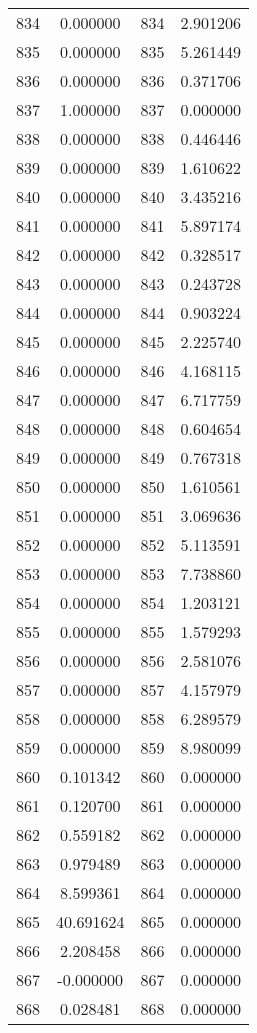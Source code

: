 \documentclass[12pt]{article}
\begin{document}
\begin{longtable}{@{}cccc@{}}
834 & 0.000000 & 834 & 2.901206 \\
835 & 0.000000 & 835 & 5.261449 \\
836 & 0.000000 & 836 & 0.371706 \\
837 & 1.000000 & 837 & 0.000000 \\
838 & 0.000000 & 838 & 0.446446 \\
839 & 0.000000 & 839 & 1.610622 \\
840 & 0.000000 & 840 & 3.435216 \\
841 & 0.000000 & 841 & 5.897174 \\
842 & 0.000000 & 842 & 0.328517 \\
843 & 0.000000 & 843 & 0.243728 \\
844 & 0.000000 & 844 & 0.903224 \\
845 & 0.000000 & 845 & 2.225740 \\
846 & 0.000000 & 846 & 4.168115 \\
847 & 0.000000 & 847 & 6.717759 \\
848 & 0.000000 & 848 & 0.604654 \\
849 & 0.000000 & 849 & 0.767318 \\
850 & 0.000000 & 850 & 1.610561 \\
851 & 0.000000 & 851 & 3.069636 \\
852 & 0.000000 & 852 & 5.113591 \\
853 & 0.000000 & 853 & 7.738860 \\
854 & 0.000000 & 854 & 1.203121 \\
855 & 0.000000 & 855 & 1.579293 \\
856 & 0.000000 & 856 & 2.581076 \\
857 & 0.000000 & 857 & 4.157979 \\
858 & 0.000000 & 858 & 6.289579 \\
859 & 0.000000 & 859 & 8.980099 \\
860 & 0.101342 & 860 & 0.000000 \\
861 & 0.120700 & 861 & 0.000000 \\
862 & 0.559182 & 862 & 0.000000 \\
863 & 0.979489 & 863 & 0.000000 \\
864 & 8.599361 & 864 & 0.000000 \\
865 & 40.691624 & 865 & 0.000000 \\
866 & 2.208458 & 866 & 0.000000 \\
867 & -0.000000 & 867 & 0.000000 \\
868 & 0.028481 & 868 & 0.000000 \\

\end{longtable}
\end{document}
